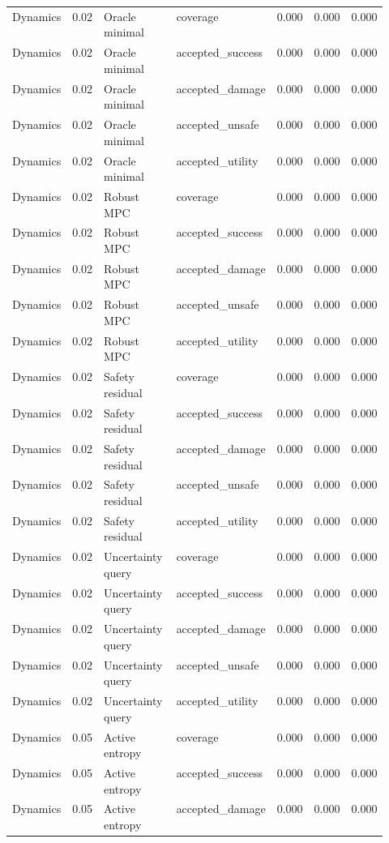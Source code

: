 \documentclass{article}
\begin{document}
\begin{center}
\begin{longtable}{p{0.13\linewidth}rp{0.22\linewidth}p{0.19\linewidth}rrr}
Dynamics & 0.02 & Oracle minimal & coverage & 0.000 & 0.000 & 0.000\\
Dynamics & 0.02 & Oracle minimal & accepted\_success & 0.000 & 0.000 & 0.000\\
Dynamics & 0.02 & Oracle minimal & accepted\_damage & 0.000 & 0.000 & 0.000\\
Dynamics & 0.02 & Oracle minimal & accepted\_unsafe & 0.000 & 0.000 & 0.000\\
Dynamics & 0.02 & Oracle minimal & accepted\_utility & 0.000 & 0.000 & 0.000\\
Dynamics & 0.02 & Robust MPC & coverage & 0.000 & 0.000 & 0.000\\
Dynamics & 0.02 & Robust MPC & accepted\_success & 0.000 & 0.000 & 0.000\\
Dynamics & 0.02 & Robust MPC & accepted\_damage & 0.000 & 0.000 & 0.000\\
Dynamics & 0.02 & Robust MPC & accepted\_unsafe & 0.000 & 0.000 & 0.000\\
Dynamics & 0.02 & Robust MPC & accepted\_utility & 0.000 & 0.000 & 0.000\\
Dynamics & 0.02 & Safety residual & coverage & 0.000 & 0.000 & 0.000\\
Dynamics & 0.02 & Safety residual & accepted\_success & 0.000 & 0.000 & 0.000\\
Dynamics & 0.02 & Safety residual & accepted\_damage & 0.000 & 0.000 & 0.000\\
Dynamics & 0.02 & Safety residual & accepted\_unsafe & 0.000 & 0.000 & 0.000\\
Dynamics & 0.02 & Safety residual & accepted\_utility & 0.000 & 0.000 & 0.000\\
Dynamics & 0.02 & Uncertainty query & coverage & 0.000 & 0.000 & 0.000\\
Dynamics & 0.02 & Uncertainty query & accepted\_success & 0.000 & 0.000 & 0.000\\
Dynamics & 0.02 & Uncertainty query & accepted\_damage & 0.000 & 0.000 & 0.000\\
Dynamics & 0.02 & Uncertainty query & accepted\_unsafe & 0.000 & 0.000 & 0.000\\
Dynamics & 0.02 & Uncertainty query & accepted\_utility & 0.000 & 0.000 & 0.000\\
Dynamics & 0.05 & Active entropy & coverage & 0.000 & 0.000 & 0.000\\
Dynamics & 0.05 & Active entropy & accepted\_success & 0.000 & 0.000 & 0.000\\
Dynamics & 0.05 & Active entropy & accepted\_damage & 0.000 & 0.000 & 0.000\\

\end{longtable}
\end{center}
\end{document}
